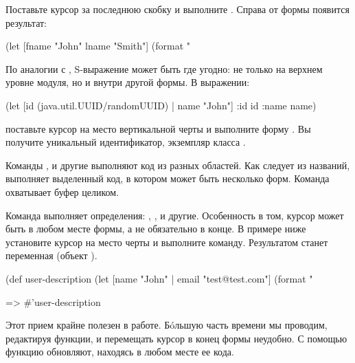 Поставьте курсор за последнюю скобку и выполните . Справа от формы появится результат:

\begin{english}
  \begin{clojure}
(let [fname "John"
      lname "Smith"]
  (format "%
  \end{clojure}
\end{english}

По аналогии с , S-выражение может быть где угодно: не только на верхнем уровне модуля, но и внутри другой формы. В выражении:

\begin{english}
  \begin{clojure}
(let [id (java.util.UUID/randomUUID) |
      name "John"]
  {:id id
   :name name})
  \end{clojure}
\end{english}

\noindent
поставьте курсор на место вертикальной черты и выполните форму . Вы получите уникальный идентификатор, экземпляр класса .

Команды ,  и другие выполняют код из разных областей. Как следует из названий,  выполняет выделенный код, в котором может быть несколько форм. Команда  охватывает буфер целиком.

Команда  выполняет определения: , ,  и другие. Особенность в том, курсор может быть в любом месте формы, а не обязательно в конце. В примере ниже установите курсор на место черты и выполните команду. Результатом станет переменная  (объект ).

\begin{english}
  \begin{clojure}
(def user-description
  (let [name "John" |
        email "test@test.com"]
    (format "%

=> #'user-description
  \end{clojure}
\end{english}

Этот прием крайне полезен в работе. Бóльшую часть времени мы проводим, редактируя функции, и перемещать курсор в конец формы неудобно. С помощью  функцию обновляют, находясь в любом месте ее кода.

